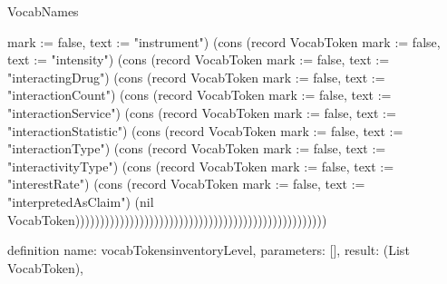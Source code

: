 \begin{lexlean}{VocabNames}
\begin{semanticmodule}
{{mark := false, text := "instrument"}) (cons (record VocabToken {mark := false, text := "intensity"}) (cons (record VocabToken {mark := false, text := "interactingDrug"}) (cons (record VocabToken {mark := false, text := "interactionCount"}) (cons (record VocabToken {mark := false, text := "interactionService"}) (cons (record VocabToken {mark := false, text := "interactionStatistic"}) (cons (record VocabToken {mark := false, text := "interactionType"}) (cons (record VocabToken {mark := false, text := "interactivityType"}) (cons (record VocabToken {mark := false, text := "interestRate"}) (cons (record VocabToken {mark := false, text := "interpretedAsClaim"}) (nil VocabToken)))))))))))))))))))))))))))))))))))))))))))))))))))
}

definition{
  name: vocabTokensinventoryLevel,
  parameters: [],
  result: (List VocabToken),
}
\end{semanticmodule}
\end{lexlean}
